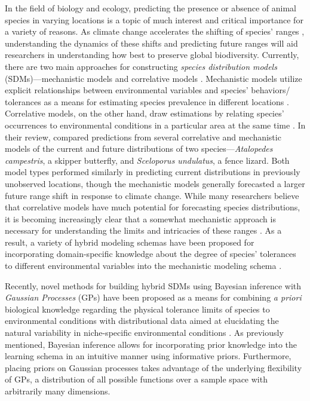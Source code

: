 \documentclass[
  12pt,
  twoside]{book}
\theoremstyle{definition}
\theoremstyle{definition}
\theoremstyle{definition}
\theoremstyle{remark}
\begin{document}
In the field of biology and ecology, predicting the presence or absence of animal species in varying locations is a topic of much interest and critical importance for a variety of reasons.
As climate change accelerates the shifting of species' ranges \citep[\citet{Steinbauer2018}]{Parmesan2003}, understanding the dynamics of these shifts and predicting future ranges will aid researchers in understanding how best to preserve global biodiversity.
Currently, there are two main approaches for constructing \emph{species distribution models} (SDMs)---mechanistic models and correlative models \citep[\citet{Kotta2019}]{Buckley2010}.
Mechanistic models utilize explicit relationships between environmental variables and species' behaviors/ tolerances as a means for estimating species prevalence in different locations \citep[\citet{Kotta2019}]{Buckley2010}.
Correlative models, on the other hand, draw estimations by relating species' occurrences to environmental conditions in a particular area at the same time \citep[\citet{Kotta2019}]{Buckley2010}.
In their review, \citet{Buckley2010} compared predictions from several correlative and mechanistic models of the current and future distributions of two species---\emph{Atalopedes campestris}, a skipper butterfly, and \emph{Sceloporus undulatus}, a fence lizard.
Both model types performed similarly in predicting current distributions in previously unobserved locations, though the mechanistic models generally forecasted a larger future range shift in response to climate change.
While many researchers believe that correlative models have much potential for forecasting species distributions, it is becoming increasingly clear that a somewhat mechanistic approach is necessary for understanding the limits and intricacies of these ranges \citep{Kearney2006}.
As a result, a variety of hybrid modeling schemas have been proposed for incorporating domain-specific knowledge about the degree of species' tolerances to different environmental variables into the mechanistic modeling schema \citep[\citet{Kearney2006}]{Buckley2010}.

Recently, novel methods for building hybrid SDMs using Bayesian inference with \emph{Gaussian Processes} (GPs) have been proposed as a means for combining \emph{a priori} biological knowledge regarding the physical tolerance limits of species to environmental conditions with distributional data aimed at elucidating the natural variability in niche-specific environmental conditions \citep{Kotta2019}.
As previously mentioned, Bayesian inference allows for incorporating prior knowledge into the learning schema in an intuitive manner using informative priors.
Furthermore, placing priors on Gaussian processes takes advantage of the underlying flexibility of GPs, a distribution of all possible functions over a sample space with arbitrarily many dimensions.
\end{document}
